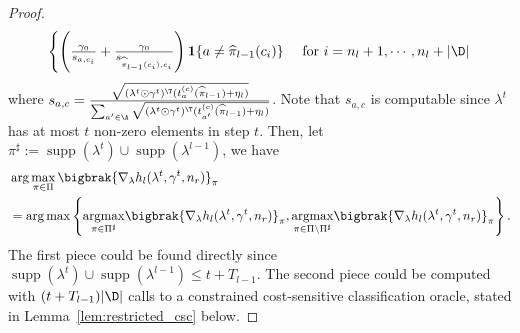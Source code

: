 \documentclass{article}
\newcommand{\pill}{\widehat{\pi}_{l-1}}
\newcommand{\1}{\mathbf{1}}
\newcommand{\supp}{\operatorname{supp}}
\begin{document}
\begin{proof}
\[\begin{cases}
    \left(\frac{\gamma_0}{s_{a,c_i}}+\frac{\gamma_0}{s_{\pill(c_i),c_i}}\right)\1\{a\neq \pill(c_i)\}&\textrm{ for }i=n_l+1,\cdots,n_l+|\D|
\end{cases}
\]
where $s_{a,c}=\frac{\sqrt{(\lambda^{t}\odot \gamma^{t})^\T (t_{a}^{(c)}(\pill)+\eta_l)}}{\sum_{a'\in\A}\sqrt{(\lambda^{t}\odot \gamma^{t})^\T (t_{a'}^{(c)}(\pill)+\eta_l)}}$. Note that $s_{a,c}$ is computable since $\lambda^{t}$ has at most $t$ non-zero elements in step $t$. Then, let $\pi^\sharp:=\operatorname{supp}(\lambda^{t})\cup\supp(\lambda^{l-1})$, we have 
\begin{align*}
    &\arg\max_{\pi\in\Pi}\bigbrak{\nabla_\lambda h_{l}(\lambda^{t},\gamma^{t},n_r)}_\pi\\
    &= \arg\max\left\{\underset{\pi\in\Pi^\sharp}{\operatorname{argmax}}\bigbrak{\nabla_\lambda h_{l}(\lambda^{t},\gamma^{t},n_r)}_\pi, \underset{\pi\in\Pi\setminus\Pi^\sharp}{\operatorname{argmax}}\bigbrak{\nabla_\lambda h_{l}(\lambda^{t},\gamma^{t},n_r)}_\pi\right\}.
\end{align*}
The first piece could be found directly since $\operatorname{supp}(\lambda^{t})\cup\supp(\lambda^{l-1})\leq t+T_{l-1}$. The second piece could be computed with $(t+T_{l-1})|\D|$ calls to a constrained cost-sensitive classification oracle, stated in Lemma~\ref{lem:restricted_csc} below. 
\end{proof}
\end{document}
